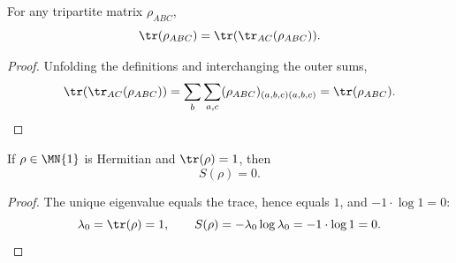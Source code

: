 \begin{theorem}
    \label{thm:trace_traceac_abc}
    \leanok
    For any tripartite matrix $\rho_{ABC}$,
    \[
        \tr(\rho_{ABC}) = \tr(\tr_{AC}(\rho_{ABC})).
    \]
\end{theorem}

\begin{proof}\leanok
    Unfolding the definitions and interchanging the outer sums,
    \[
        \tr(\tr_{AC}(\rho_{ABC}))
        = \sum_{b} \sum_{a,c}
        (\rho_{ABC})_{(a,b,c)(a,b,c)}
        = \tr(\rho_{ABC}).
    \]
\end{proof}


\begin{theorem}
    \label{thm:entropy_fin_one_zero}
    \leanok
    If $\rho \in \MN{1}$ is Hermitian and $\tr(\rho) = 1$, then
    \[
        S(\rho) = 0.
    \]
\end{theorem}

\begin{proof}\leanok
    The unique eigenvalue equals the trace, hence equals $1$, and
    $-1 \cdot \log 1 = 0$:
    \[
        \lambda_0 = \tr(\rho) = 1,
        \qquad
        S(\rho) = -\lambda_0 \log \lambda_0 = -1 \cdot \log 1 = 0.
    \]
\end{proof}
